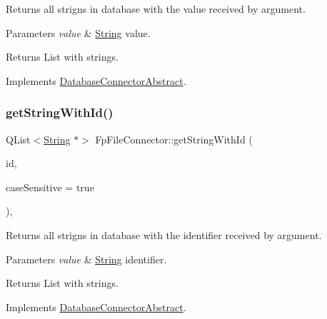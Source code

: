 Returns all strigns in database with the value received by argument. 


\begin{DoxyParams}{Parameters}
{\em value} & \mbox{\hyperlink{classString}{String}} value. \\
\hline
\end{DoxyParams}
\begin{DoxyReturn}{Returns}
List with strings. 
\end{DoxyReturn}


Implements \mbox{\hyperlink{classDatabaseConnectorAbstract_a1d33547045c5f8619f44290c932edb1b}{Database\+Connector\+Abstract}}.

\mbox{\label{classFpFileConnector_a29a6df6ea88a1e44f6b04c600b45925c}} 
\subsubsection{\texorpdfstring{get\+String\+With\+Id()}{getStringWithId()}}
{\footnotesize\ttfamily Q\+List$<$\mbox{\hyperlink{classString}{String}} $\ast$$>$ Fp\+File\+Connector\+::get\+String\+With\+Id (\begin{DoxyParamCaption}\item[{const Q\+String \&}]{id,  }\item[{bool}]{case\+Sensitive = {\ttfamily true} }\end{DoxyParamCaption})\hspace{0.3cm}{\ttfamily [override]}, {\ttfamily [virtual]}}



Returns all strigns in database with the identifier received by argument. 


\begin{DoxyParams}{Parameters}
{\em value} & \mbox{\hyperlink{classString}{String}} identifier. \\
\hline
\end{DoxyParams}
\begin{DoxyReturn}{Returns}
List with strings. 
\end{DoxyReturn}


Implements \mbox{\hyperlink{classDatabaseConnectorAbstract_a757f25feaf50af012d25db8f27b1fef4}{Database\+Connector\+Abstract}}.

\mbox{\label{classFpFileConnector_ae4f79d6a1281a20702b0257de56822b2}} 
